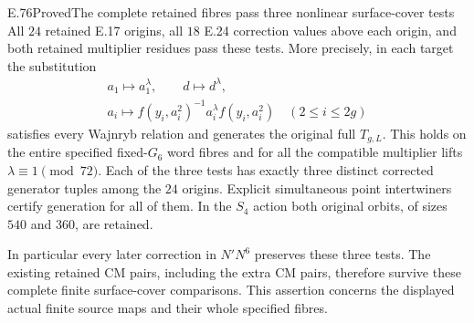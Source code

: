 \begin{statement}{E.76}{Proved}{The complete retained fibres pass three nonlinear surface-cover tests}
All $24$ retained E.17 origins, all $18$ E.24 correction values above
each origin, and both retained multiplier residues pass these tests.
More precisely, in each target the substitution
\[
 \begin{gathered}
 a_1\longmapsto a_1^\lambda,\qquad d\longmapsto d^\lambda,\\
 a_i\longmapsto f(y_i,a_i^2)^{-1}a_i^\lambda f(y_i,a_i^2)
                         \quad(2\leq i\leq2g)
 \end{gathered}
 \tag{E.76.7}
\]
satisfies every Wajnryb relation and generates the original full
$T_{g,L}$.  This holds on the entire specified fixed-$G_6$ word
fibres and for all the compatible multiplier lifts
$\lambda\equiv1\pmod {72}$.  Each of the three tests has exactly
three distinct corrected generator tuples among the $24$ origins.
Explicit simultaneous point intertwiners certify generation for all
of them.  In the $S_4$ action both original orbits, of sizes $540$
and $360$, are retained.

In particular every later correction in $N'N^6$ preserves these
three tests. The existing retained CM pairs, including the extra
CM pairs, therefore survive these complete finite surface-cover
comparisons. This assertion concerns the displayed actual finite
source maps and their whole specified fibres.
\end{statement}
